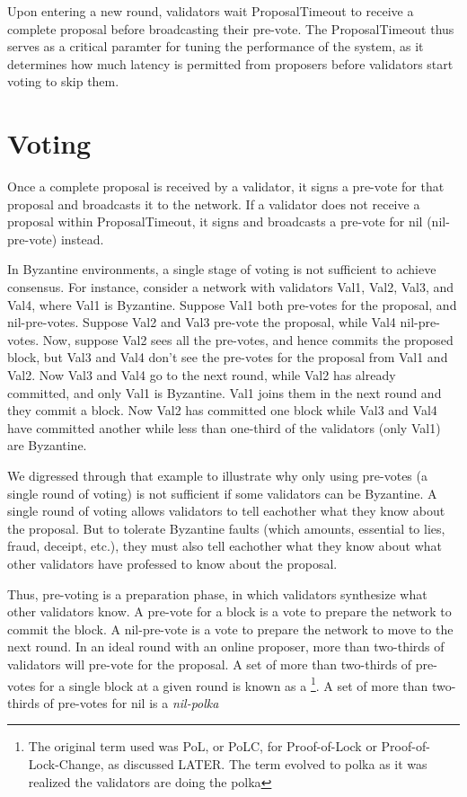 Upon entering a new round, validators wait ProposalTimeout to receive a complete proposal before broadcasting their pre-vote.
The ProposalTimeout thus serves as a critical paramter for tuning the performance of the system,
as it determines how much latency is permitted from proposers before validators start voting to skip them.

\section{Voting}

Once a complete proposal is received by a validator, 
it signs a pre-vote for that proposal and broadcasts it to the network.
If a validator does not receive a proposal within ProposalTimeout, 
it signs and broadcasts a pre-vote for nil (nil-pre-vote) instead.

In Byzantine environments, a single stage of voting is not sufficient to achieve consensus.
For instance, consider a network with validators Val1, Val2, Val3, and Val4, where Val1 is Byzantine.
Suppose Val1 both pre-votes for the proposal, and nil-pre-votes.
Suppose Val2 and Val3 pre-vote the proposal, while Val4 nil-pre-votes.
Now, suppose Val2 sees all the pre-votes, and hence commits the proposed block,
but Val3 and Val4 don't see the pre-votes for the proposal from Val1 and Val2.
Now Val3 and Val4 go to the next round, while Val2 has already committed, and only Val1 is Byzantine.
Val1 joins them in the next round and they commit a block.
Now Val2 has committed one block while Val3 and Val4 have committed another while less than one-third of the validators (only Val1) are Byzantine.

We digressed through that example to illustrate why only using pre-votes (a single round of voting) 
is not sufficient if some validators can be Byzantine.
A single round of voting allows validators to tell eachother what they know about the proposal.	
But to tolerate Byzantine faults (which amounts, essential to lies, fraud, deceipt, etc.), 
they must also tell eachother what they know about what other validators have professed to know about the proposal.

Thus, pre-voting is a preparation phase, in which validators synthesize what other validators know.
A pre-vote for a block is a vote to prepare the network to commit the block.
A nil-pre-vote is a vote to prepare the network to move to the next round.
In an ideal round with an online proposer, more than two-thirds of validators will pre-vote for the proposal.
A set of more than two-thirds of pre-votes for a single block at a given round is known as a  \footnote{The original term used was PoL, or PoLC, for Proof-of-Lock or Proof-of-Lock-Change, as discussed LATER. The term evolved to polka as it was realized the validators are doing the polka}.
A set of more than two-thirds of pre-votes for nil is a \emph{nil-polka}

